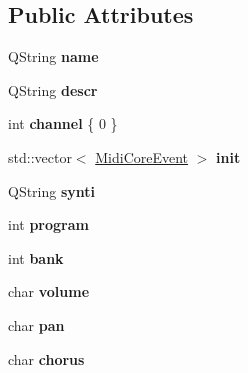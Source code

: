 \subsection*{Public Attributes}
\begin{DoxyCompactItemize}
\item 
\mbox{\label{struct_ms_1_1_channel_a3da71edd9001b297afcbf2ae6830074d}} 
Q\+String {\bfseries name}
\item 
\mbox{\label{struct_ms_1_1_channel_a84b5795994586aee723c477b2568e74f}} 
Q\+String {\bfseries descr}
\item 
\mbox{\label{struct_ms_1_1_channel_a61ff6951194f9af6e53f75d88dc5a77e}} 
int {\bfseries channel} \{ 0 \}
\item 
\mbox{\label{struct_ms_1_1_channel_a7ab58577911adffbd7c691a659cb63a2}} 
std\+::vector$<$ \hyperlink{class_ms_1_1_midi_core_event}{Midi\+Core\+Event} $>$ {\bfseries init}
\item 
\mbox{\label{struct_ms_1_1_channel_aa91f414b7d4587c28a6c4a620902aa29}} 
Q\+String {\bfseries synti}
\item 
\mbox{\label{struct_ms_1_1_channel_a39af7fd638d47025003be92b1511d159}} 
int {\bfseries program}
\item 
\mbox{\label{struct_ms_1_1_channel_aed3d5e0211286555278f517b637fea0d}} 
int {\bfseries bank}
\item 
\mbox{\label{struct_ms_1_1_channel_a6de4b8c6de633c8a6bf6dafb9b26da42}} 
char {\bfseries volume}
\item 
\mbox{\label{struct_ms_1_1_channel_a804b57139b7a5d94c9011926d99b8dbe}} 
char {\bfseries pan}
\item 
\mbox{\label{struct_ms_1_1_channel_a5c0dd2b995244cfecce305e40fdfcfbf}} 
char {\bfseries chorus}
\item 
\mbox{\label{struct_ms_1_1_channel_a5c04843501e6c8a73171c16dca838b75}} 

\end{DoxyCompactItemize}
